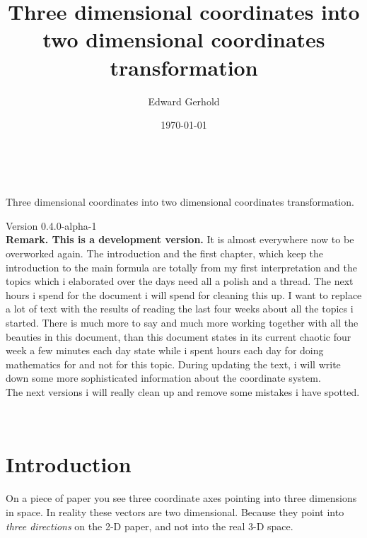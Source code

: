 \documentclass[a4paper]{article}
\begin{document}
\begin{center}
\title{Three dimensional coordinates into two dimensional coordinates transformation}\\
\author{Edward Gerhold}
Three dimensional coordinates into two dimensional coordinates transformation.
\date{\today}
\maketitle

Version 0.4.0-alpha-1\\

\textbf{Remark. This is a development version.} It is almost everywhere now to be overworked again. The introduction and the first chapter, which keep the introduction to the main formula are totally from my first interpretation and the topics which i elaborated over the days need all a polish and a thread. The next hours i spend for the document i will spend for cleaning this up. I want to replace a lot of text with the results of reading the last four weeks about all the topics i started. There is much more to say and much more working together with all the beauties in this document, than this document states in its current chaotic four week a few minutes each day state while i spent hours each day for doing mathematics for and not for this topic. During updating the text, i will write down some more sophisticated information about the coordinate system.\\
The next versions i will really clean up and remove some mistakes i have spotted.\\

\end{center} 

\tableofcontents\\

\section{Introduction}

On a piece of paper you see three coordinate axes pointing into three
dimensions in space. In reality these vectors are two dimensional. Because
they point into \emph{three directions} on the 2-D paper,
and not into the real 3-D space.\\
\end{document}
